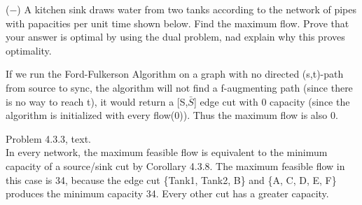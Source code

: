 \documentclass[12pt]{article}
\newenvironment{question}[2][Question]{\begin{trivlist}
\item[\hskip \labelsep {\bfseries #1}\hskip \labelsep {\bfseries #2.}]}{\end{trivlist}}
\begin{document}
\begin{question}{10}
($-$) A kitchen sink draws water from two tanks according to the network of pipes with papacities per unit time shown below.  Find the maximum flow.  Prove that your answer is optimal by using the dual problem, nad explain why this proves optimality.

	If we run the Ford-Fulkerson Algorithm on a graph with no directed (s,t)-path from source to sync, the algorithm will not find a f-augmenting path (since there is no way to reach t), it would return a [S,$\bar{S}$] edge cut with 0 capacity (since the algorithm is initialized with every flow(0)). Thus the maximum flow is also 0. 
\end{question}

\begin{question}{10} Problem 4.3.3, text. \\
	In every network, the maximum feasible flow is equivalent to the minimum capacity of a source/sink cut by Corollary 4.3.8. The maximum feasible flow in this case is 34, because the edge cut \{Tank1, Tank2, B\} and \{A, C, D, E, F\} produces the minimum capacity 34. Every other cut has a greater capacity. \\
	

\end{question}




\end{document}
